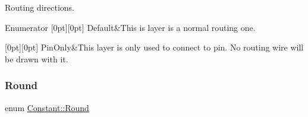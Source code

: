 Routing directions. \begin{DoxyEnumFields}{Enumerator}
[0pt][0pt]{}\mbox{\label{namespaceConstant_ab2e46a17cc373a268c5c24fa0e2067e5ac83c789478a5dfedee2496415c62c1fb}} 
Default&This is layer is a normal routing one. \\
\hline

[0pt][0pt]{}\mbox{\label{namespaceConstant_ab2e46a17cc373a268c5c24fa0e2067e5a816e7f6e3fb44de0c2da893f32a6748e}} 
Pin\+Only&This layer is only used to connect to pin. No routing wire will be drawn with it. \\
\hline

\end{DoxyEnumFields}
\mbox{\label{namespaceConstant_abb6258ce09861f20cfe37b49d9a3515f}} 
\subsubsection{\texorpdfstring{Round}{Round}}
{\footnotesize\ttfamily enum \mbox{\hyperlink{namespaceConstant_abb6258ce09861f20cfe37b49d9a3515f}{Constant\+::\+Round}}}

